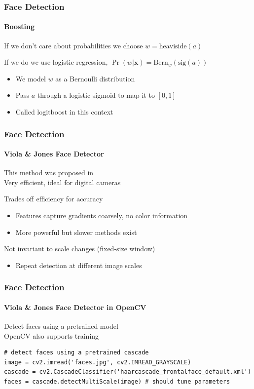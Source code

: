 \documentclass[xetex,professionalfont]{beamer}
\renewcommand{\vec}[1]{\ensuremath{\mathbf{#1}}}
\newcommand{\vx}{\vec{x}}
\renewcommand\emph[1]{\textcolor{tuwcvl_inf_red}{#1}}
\begin{document}

\begin{frame}
\frametitle{Face Detection}
\framesubtitle{Boosting}

If we don't care about probabilities we choose $w=\text{heaviside}(a)$

\bigskip
If we do we use \emph{logistic regression}, $\Pr(w|\vx)=\text{Bern}_w(\text{sig}(a))$
\begin{itemize}
    \item We model $w$ as a Bernoulli distribution
    \item Pass $a$ through a logistic sigmoid to map it to $[0,1]$
    \item Called \emph{logitboost} in this context
\end{itemize}

\end{frame}


\begin{frame}
\frametitle{Face Detection}
\framesubtitle{Viola \& Jones Face Detector}

This method was proposed in \cite{viola2001} \\
Very efficient, ideal for digital cameras

\bigskip
Trades off efficiency for accuracy
\begin{itemize}
    \item Features capture gradients coarsely, no color information
    \item More powerful but slower methods exist
\end{itemize}

\bigskip
Not invariant to scale changes (fixed-size window)
\begin{itemize}
    \item Repeat detection at different image scales
\end{itemize}

\end{frame}


\begin{frame}[fragile]
\frametitle{Face Detection}
\framesubtitle{Viola \& Jones Face Detector in OpenCV}

Detect faces using a pretrained model \\
OpenCV also supports training

\bigskip
\small
\begin{verbatim}
# detect faces using a pretrained cascade
image = cv2.imread('faces.jpg', cv2.IMREAD_GRAYSCALE)
cascade = cv2.CascadeClassifier('haarcascade_frontalface_default.xml')
faces = cascade.detectMultiScale(image) # should tune parameters
\end{verbatim}

\end{frame}
\end{document}
